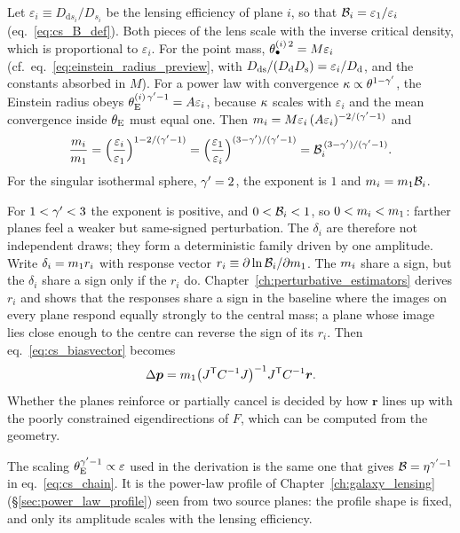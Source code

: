 \begin{derivation}
Let $\varepsilon_i\equiv D_{\mathrm{d}s_i}/D_{s_i}$ be the lensing
efficiency of plane $i$, so that $\mathcal{B}_i=\varepsilon_1/\varepsilon_i$
(eq.~\ref{eq:cs_B_def}). Both pieces of the lens scale with the inverse
critical density, which is proportional to $\varepsilon_i$. For the
point mass, $\theta_{\bullet}^{(i)\,2}=M\varepsilon_i$
(cf.\ eq.~\ref{eq:einstein_radius_preview}, with
$D_{\mathrm{ds}}/(D_{\mathrm{d}}D_{\mathrm{s}})=\varepsilon_i/D_{\mathrm{d}}$, and the constants absorbed in $M$).
For a power law with convergence $\kappa\propto\theta^{1-\gamma'}$, the
Einstein radius obeys $\theta_{\mathrm{E}}^{(i)\,\gamma'-1}=A\varepsilon_i$, because
$\kappa$ scales with $\varepsilon_i$ and the mean convergence inside
$\theta_{\mathrm{E}}$ must equal one.
Then $m_i=M\varepsilon_i\,(A\varepsilon_i)^{-2/(\gamma'-1)}$ and
\[
  \frac{m_i}{m_1}
  =\Bigl(\frac{\varepsilon_i}{\varepsilon_1}\Bigr)^{1-2/(\gamma'-1)}
  =\Bigl(\frac{\varepsilon_1}{\varepsilon_i}\Bigr)^{(3-\gamma')/(\gamma'-1)}
  =\mathcal{B}_i^{\,(3-\gamma')/(\gamma'-1)} .
\]
For the singular isothermal sphere, $\gamma'=2$, the exponent is $1$ and
$m_i=m_1\mathcal{B}_i$.
\end{derivation}

For $1<\gamma'<3$ the exponent is positive, and $0<\mathcal{B}_i<1$, so
$0<m_i<m_1$: farther planes feel a weaker but same-signed
perturbation. The $\delta_i$ are therefore not independent draws; they
form a deterministic family driven by one amplitude. Write
$\delta_i=m_1 r_i$ with response vector
$r_i\equiv\partial\ln\mathcal{B}_i/\partial m_1$. The $m_i$ share a
sign, but the $\delta_i$ share a sign only if the $r_i$ do.
Chapter~\ref{ch:perturbative_estimators} derives $r_i$ and shows that
the responses share a sign in the baseline where the images on every
plane respond equally strongly to the central mass; a plane whose image
lies close enough to the centre can reverse the sign of its $r_i$. Then
eq.~\eqref{eq:cs_biasvector} becomes
\begin{equation}
  \Delta\bm{p}=m_1\bigl(J^{\mathsf T}C^{-1}J\bigr)^{-1}
  J^{\mathsf T}C^{-1}\bm{r} .
  \label{eq:cs_coherentbias}
\end{equation}
Whether the planes reinforce or partially cancel is decided by how
$\bm{r}$ lines up with the poorly constrained eigendirections of $F$,
which can be computed from the geometry.

\begin{bridge}
The scaling $\theta_{\mathrm{E}}^{\gamma'-1}\propto\varepsilon$ used in the derivation is
the same one that gives $\mathcal{B}=\eta^{\gamma'-1}$ in
eq.~\eqref{eq:cs_chain}. It is the power-law profile of
Chapter~\ref{ch:galaxy_lensing} (\S\ref{sec:power_law_profile}) seen from
two source planes: the profile shape is fixed, and only its amplitude
scales with the lensing efficiency.
\end{bridge}


